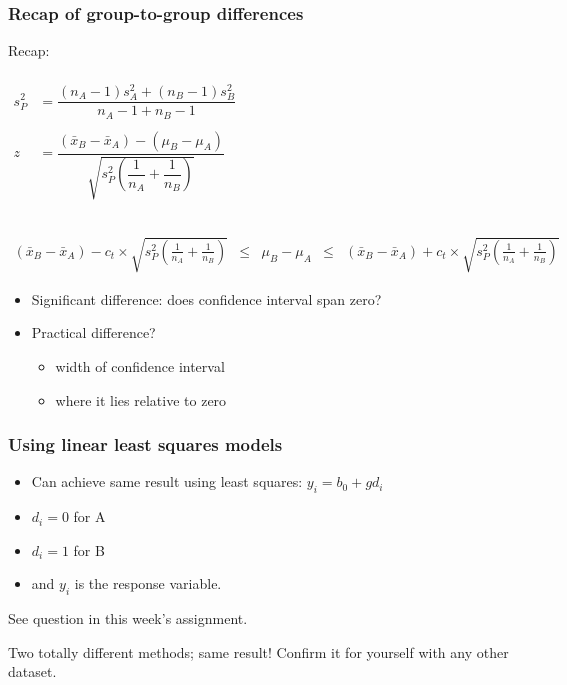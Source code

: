 \begin{frame}\frametitle{Recap of group-to-group differences}

	Recap:

	$
	\begin{array}{rcl}
		\\
		s_P^2 &= \dfrac{(n_A -1) s_A^2 + (n_B-1)s_B^2}{n_A - 1 + n_B - 1} \\
		& \\
		z &= \dfrac{(\bar{x}_B - \bar{x}_A) - (\mu_B - \mu_A)}{\sqrt{s_P^2 \left(\dfrac{1}{n_A} + \dfrac{1}{n_B}\right)}}\\
		\\
	\end{array}
	$

	$
	\begin{array}{rcccl}
		\\
		{\scriptstyle (\bar{x}_B - \bar{x}_A) - c_t} \times \sqrt{\scriptstyle s_P^2 \left(\frac{1}{n_A} + \frac{1}{n_B}\right)} &\leq& {\scriptstyle \mu_B - \mu_A} &\leq & {\scriptstyle (\bar{x}_B - \bar{x}_A) + c_t } \times \sqrt{\scriptstyle s_P^2 \left(\frac{1}{n_A} + \frac{1}{n_B}\right)}
	\end{array}
	$
	\begin{itemize}
		\item	Significant difference: does confidence interval span zero?
		\item	Practical difference?
		\begin{itemize}
			\item	width of confidence interval
			\item	where it lies relative to zero
		\end{itemize}
	\end{itemize}
\end{frame}

\begin{frame}\frametitle{Using linear least squares models}
	\begin{itemize}
		\item	Can achieve same result using least squares: $y_i = b_0 + g d_i$
		\item	$d_i = 0$ for A
		\item	$d_i=1$ for B
		\item	and $y_i$ is the response variable.
	\end{itemize}

	See question in this week's assignment.

	Two totally different methods; same result! Confirm it for yourself with any other dataset.
\end{frame}

